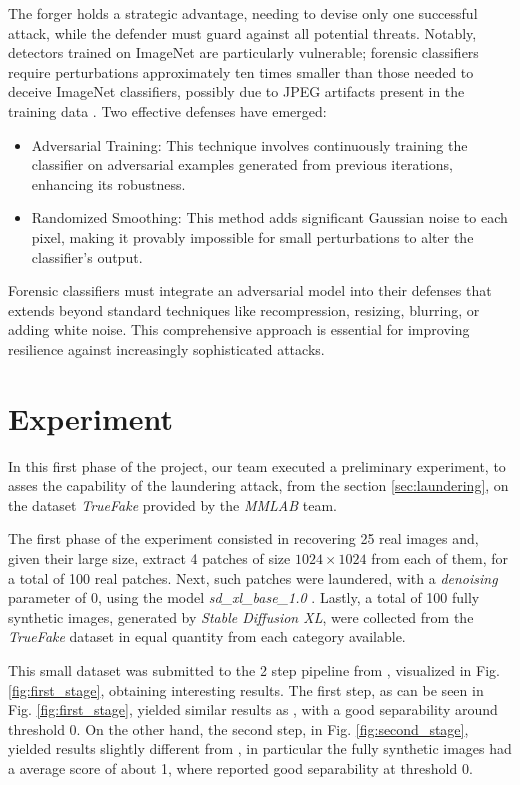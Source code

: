 \documentclass[conference]{IEEEtran} %
\begin{document}
        The forger holds a strategic advantage, needing to devise only one successful attack, while the defender must guard against all potential threats. Notably, detectors trained on ImageNet \cite{denglarge} are particularly vulnerable; forensic classifiers require perturbations approximately ten times smaller than those needed to deceive ImageNet classifiers, possibly due to JPEG artifacts present in the training data \cite{mardeenpaper1}.
        Two effective defenses have emerged:
        \begin{itemize}
            \item Adversarial Training: This technique involves continuously training the classifier on adversarial examples generated from previous iterations, enhancing its robustness.
            \item Randomized Smoothing: This method adds significant Gaussian noise to each pixel, making it provably impossible for small perturbations to alter the classifier's output.
        \end{itemize}
        
        Forensic classifiers must integrate an adversarial model into their defenses that extends beyond standard techniques like recompression, resizing, blurring, or adding white noise. This comprehensive approach is essential for improving resilience against increasingly sophisticated attacks.

\section{Experiment}
    In this first phase of the project, our team executed a preliminary experiment, to asses the capability of the laundering attack, from the section \ref{sec:laundering}, on the dataset \textit{TrueFake} provided by the \textit{MMLAB} team.

    The first phase of the experiment consisted in recovering 25 real images and, given their large size, extract 4 patches of size $1024\times1024$ from each of them, for a total of 100 real patches. Next, such patches were laundered, with a \textit{denoising} parameter of 0, using the model \textit{sd\_xl\_base\_1.0} \cite{sdxl_base_1_0}. Lastly, a total of 100 fully synthetic images, generated by \textit{Stable Diffusion XL}, were collected from the \textit{TrueFake} dataset in equal quantity from each category available.

    This small dataset was submitted to the 2 step pipeline from \cite{mandelli2024synthetic}, visualized in Fig. \ref{fig:first_stage}, obtaining interesting results. The first step, as can be seen in Fig. \ref{fig:first_stage},  yielded similar results as \cite{mandelli2024synthetic}, with a good separability around threshold 0. On the other hand, the second step, in Fig. \ref{fig:second_stage}, yielded results slightly different from \cite{mandelli2024synthetic}, in particular the fully synthetic images had a average score of about 1, where \cite{mandelli2024synthetic} reported good separability at threshold 0. 
\end{document}
